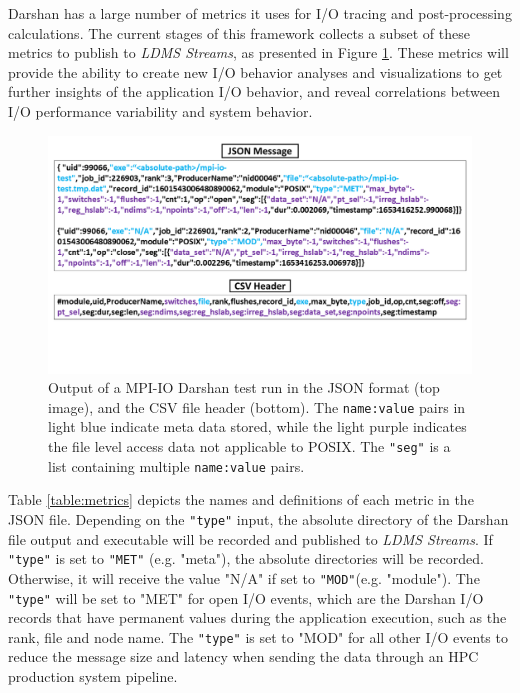 Darshan has a large number of metrics it uses for I/O tracing and
post-processing calculations. The current stages of this framework
collects a subset of these metrics to publish to \emph{LDMS Streams},
as presented in Figure \ref{f:CSV Header and Output}. These metrics
will provide the ability to create new I/O behavior analyses and visualizations to get further
insights of the application I/O behavior, and reveal correlations
between I/O performance variability and system behavior.
\begin{figure}
	\centering
	\includegraphics[trim={0 3cm 0 0},clip, width=1.01\linewidth]{figs/darshan-csv-json.pdf}
	\caption{Output of a MPI-IO Darshan test run in the JSON
          format (top image), and the CSV file header (bottom). 
          The \texttt{name:value} pairs in light blue
          indicate meta data stored, while the light purple indicates
          the file level access data not applicable to POSIX.
          The \texttt{"seg"} is a list containing multiple \texttt{name:value} pairs.}
	\label{f:CSV Header and Output}
\end{figure}
Table \ref{table:metrics} depicts the names and definitions of each
metric in the JSON file. Depending on the \texttt{"type"} input, the
absolute directory of the Darshan file output and executable will be
recorded and published to \emph{LDMS Streams}. If \texttt{"type"} is
set to \texttt{"MET"} (e.g. "meta"), the absolute directories will be
recorded. Otherwise, it will receive the value "N/A" if set to
\texttt{"MOD"}(e.g. "module"). The \texttt{"type"} will be set to
"MET" for open I/O events, which are the Darshan I/O records that have
permanent values during the application execution, such as the rank,
file and node name. The \texttt{"type"} is set to "MOD" for all other
I/O events to reduce the message size and latency when sending the
data through an HPC production system pipeline.


